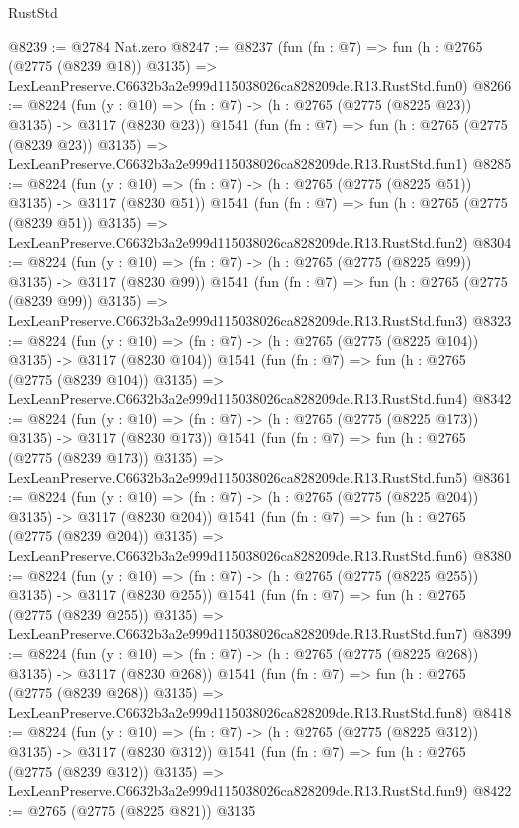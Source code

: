 \begin{lexlean}{RustStd}
\begin{coremodule}
@8239 := @2784 Nat.zero
@8247 := @8237
    (fun (fn : @7) =>
    fun (h : @2765 (@2775 (@8239 @18)) @3135) =>
    LexLeanPreserve.C6632b3a2e999d115038026ca828209de.R13.RustStd.fun0)
@8266 := @8224
    (fun (y : @10) => (fn : @7) -> (h : @2765 (@2775 (@8225 @23)) @3135) -> @3117 (@8230 @23))
    @1541
    (fun (fn : @7) =>
    fun (h : @2765 (@2775 (@8239 @23)) @3135) =>
    LexLeanPreserve.C6632b3a2e999d115038026ca828209de.R13.RustStd.fun1)
@8285 := @8224
    (fun (y : @10) => (fn : @7) -> (h : @2765 (@2775 (@8225 @51)) @3135) -> @3117 (@8230 @51))
    @1541
    (fun (fn : @7) =>
    fun (h : @2765 (@2775 (@8239 @51)) @3135) =>
    LexLeanPreserve.C6632b3a2e999d115038026ca828209de.R13.RustStd.fun2)
@8304 := @8224
    (fun (y : @10) => (fn : @7) -> (h : @2765 (@2775 (@8225 @99)) @3135) -> @3117 (@8230 @99))
    @1541
    (fun (fn : @7) =>
    fun (h : @2765 (@2775 (@8239 @99)) @3135) =>
    LexLeanPreserve.C6632b3a2e999d115038026ca828209de.R13.RustStd.fun3)
@8323 := @8224
    (fun (y : @10) => (fn : @7) -> (h : @2765 (@2775 (@8225 @104)) @3135) -> @3117 (@8230 @104))
    @1541
    (fun (fn : @7) =>
    fun (h : @2765 (@2775 (@8239 @104)) @3135) =>
    LexLeanPreserve.C6632b3a2e999d115038026ca828209de.R13.RustStd.fun4)
@8342 := @8224
    (fun (y : @10) => (fn : @7) -> (h : @2765 (@2775 (@8225 @173)) @3135) -> @3117 (@8230 @173))
    @1541
    (fun (fn : @7) =>
    fun (h : @2765 (@2775 (@8239 @173)) @3135) =>
    LexLeanPreserve.C6632b3a2e999d115038026ca828209de.R13.RustStd.fun5)
@8361 := @8224
    (fun (y : @10) => (fn : @7) -> (h : @2765 (@2775 (@8225 @204)) @3135) -> @3117 (@8230 @204))
    @1541
    (fun (fn : @7) =>
    fun (h : @2765 (@2775 (@8239 @204)) @3135) =>
    LexLeanPreserve.C6632b3a2e999d115038026ca828209de.R13.RustStd.fun6)
@8380 := @8224
    (fun (y : @10) => (fn : @7) -> (h : @2765 (@2775 (@8225 @255)) @3135) -> @3117 (@8230 @255))
    @1541
    (fun (fn : @7) =>
    fun (h : @2765 (@2775 (@8239 @255)) @3135) =>
    LexLeanPreserve.C6632b3a2e999d115038026ca828209de.R13.RustStd.fun7)
@8399 := @8224
    (fun (y : @10) => (fn : @7) -> (h : @2765 (@2775 (@8225 @268)) @3135) -> @3117 (@8230 @268))
    @1541
    (fun (fn : @7) =>
    fun (h : @2765 (@2775 (@8239 @268)) @3135) =>
    LexLeanPreserve.C6632b3a2e999d115038026ca828209de.R13.RustStd.fun8)
@8418 := @8224
    (fun (y : @10) => (fn : @7) -> (h : @2765 (@2775 (@8225 @312)) @3135) -> @3117 (@8230 @312))
    @1541
    (fun (fn : @7) =>
    fun (h : @2765 (@2775 (@8239 @312)) @3135) =>
    LexLeanPreserve.C6632b3a2e999d115038026ca828209de.R13.RustStd.fun9)
@8422 := @2765 (@2775 (@8225 @821)) @3135

\end{coremodule}
\end{lexlean}
